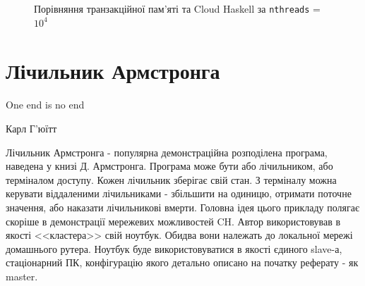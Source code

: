 \documentclass[12pt]{article}
\begin{document}
\begin{figure}
\hfill
{}
\hfill
{}
\hfill
\caption{Порівняння транзакційної пам'яті та Cloud Haskell за \lstinline{nthreads} = $10^4$}
\label{compare10K}
\end{figure}

\section{Лічильник Армстронга}
\epigraph{One end is no end}{Карл Г'юїтт}

Лічильник Армстронга - популярна демонстраційна розподілена програма, наведена у книзі 
Д. Армстронга\cite{programmingErlang}. Програма може бути або лічильником, або терміналом доступу. Кожен лічильник зберігає свій стан. З терміналу можна керувати віддаленими лічильниками - збільшити на одиницю, отримати поточне значення, або наказати лічильникові вмерти. Головна ідея цього прикладу полягає скоріше в 
демонстрації мережевих можливостей CH. Автор використовував в якості <<кластера>> 
свій ноутбук. Обидва вони належать до локальної мережі домашнього рутера.
Ноутбук буде використовуватися в якості єдиного slave-а, стаціонарний ПК, конфігурацію
якого детально описано на початку реферату - як master.\\
\end{document}
